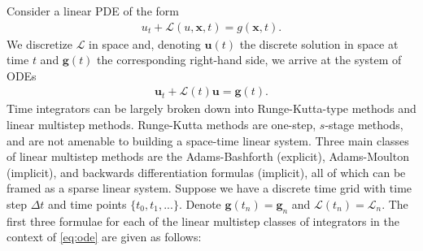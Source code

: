 \documentclass[a4paper,12pt]{article}
\begin{document}
Consider a linear PDE of the form 
\begin{align*}
u_t + \mathcal{L}(u,\mathbf{x},t) = g(\mathbf{x},t).
\end{align*}
We discretize $\mathcal{L}$ in space and, denoting $\mathbf{u}(t)$ the discrete solution in space at time $t$
and $\mathbf{g}(t)$ the corresponding right-hand side, we arrive at the system of ODEs 
\begin{align}\label{eq:ode}
\mathbf{u}_t + \mathcal{L}(t)\mathbf{u} = \mathbf{g}(t).
\end{align}
Time integrators can be largely broken down into Runge-Kutta-type methods and linear multistep methods. Runge-Kutta methods
are one-step, $s$-stage methods, and are not amenable to building a space-time linear system. Three main classes of linear multistep
methods are the Adams-Bashforth (explicit), Adams-Moulton (implicit), and backwards differentiation formulas (implicit), all of which
can be framed as a sparse linear system. Suppose we have a discrete time grid with time step $\Delta t$ and time points $\{t_0,t_1,...\}$.
Denote $\mathbf{g}(t_n) = \mathbf{g}_n$ and $\mathcal{L}(t_n) = \mathcal{L}_n$. The first three formulae for each of the linear
multistep classes of integrators in the context of \eqref{eq:ode} are given as follows:
%
\end{document}
